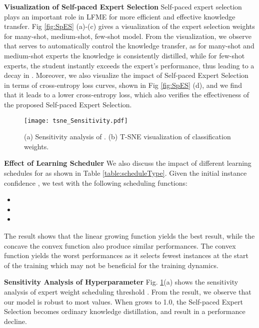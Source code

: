 \documentclass[runningheads]{llncs}
\begin{document}
	
	\noindent\textbf{Visualization of Self-paced Expert Selection} \quad
	Self-paced expert selection plays an important role in LFME for more efficient and effective knowledge transfer. Fig \ref{fig:SpES} (a)-(c) gives a visualization of the expert selection weights  for many-shot, medium-shot, few-shot model. From the visualization, we observe that  serves to automatically control the knowledge transfer, as for many-shot and medium-shot experts the knowledge is consistently distilled, while for few-shot experts, the student instantly exceeds the expert's performance, thus leading to a decay in . Moreover, we also visualize the impact of Self-paced Expert Selection in terms of cross-entropy loss curves, shown in Fig \ref{fig:SpES} (d), and we find that it leads to a lower cross-entropy loss, which also verifies the effectiveness of the proposed Self-paced Expert Selection.
	
	
	
	
	


	
	
	
	
	


	\begin{figure}[htbp!]
		\centering
		\texttt{[image: tsne\_Sensitivity.pdf]}
		\caption{(a) Sensitivity analysis of . (b) T-SNE visualization of classification weights.}
		\label{fig:tsne_sensitivity}
	\end{figure}
	
	\noindent\textbf{Effect of Learning Scheduler} \quad
	We also discuss the impact of different learning schedules for  as shown in Table \ref{table:scheduleType}. Given the initial instance confidence , we test with the following scheduling functions: 
	\begin{itemize}
		\item 
		\item 
		\item 
	\end{itemize}
The result shows that the linear growing function yields the best result, while the concave the convex function  also produce similar performances. The convex function yields the worst performances as it selects fewest instances at the start of the training which may not be beneficial for the training dynamics.
	
	
	
	
	\noindent\textbf{Sensitivity Analysis of Hyperparameter } \quad
	Fig. \ref{fig:tsne_sensitivity}(a) shows the sensitivity analysis of expert weight scheduling threshold . From the result, we observe that our model is robust to most  values. When  grows to 1.0, the Self-paced Expert Selection becomes ordinary knowledge distillation, and result in a performance decline.
	
\end{document}

